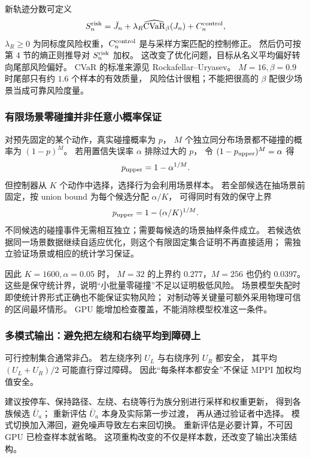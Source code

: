新轨迹分数可定义
\begin{equation}
S_n^{\rm risk}=\bar J_n+\lambda_R\widehat{\operatorname{CVaR}}_\beta(J_n)+C_n^{\rm control},
\label{eq:riskcost}
\end{equation}
$\lambda_R\ge0$ 为同标度风险权重，$C_n^{\rm control}$ 是与采样方案匹配的控制修正。
然后仍可按第 4 节的熵正则推导对 $S_n^{\rm risk}$ 加权。
这改变了优化问题，目标从名义平均偏好转向尾部风险偏好。
CVaR 的标准来源见 Rockafellar--Uryasev\cite{cvarref}。
$M=16,\beta=0.9$ 时尾部只有约 $1.6$ 个样本的有效质量，
风险估计很粗；不能把很高的 $\beta$ 配很少场景当成可靠风险度量。

\subsubsection{有限场景零碰撞并非任意小概率保证}
对预先固定的某个动作，真实碰撞概率为 $p$，
$M$ 个独立同分布场景都不碰撞的概率为 $(1-p)^M$。
若用置信失误率 $\alpha$ 排除过大的 $p$，
令 $(1-p_{\rm upper})^M=\alpha$ 得
\[
p_{\rm upper}=1-\alpha^{1/M}.
\]
但控制器从 $K$ 个动作中选择，选择行为会利用场景样本。
若全部候选在抽场景前固定，按 union bound 为每个候选分配 $\alpha/K$，
可得同时有效的保守上界
\begin{equation}
p_{\rm upper}=1-(\alpha/K)^{1/M}.
\label{eq:scenario}
\end{equation}
不同候选的碰撞事件无需相互独立；需要每候选的场景抽样条件成立。
若候选依据同一场景数据继续自适应优化，则这个有限固定集合证明不再直接适用；
需独立验证场景或相应的统计学习保证。

因此 $K=1600,\alpha=0.05$ 时，
$M=32$ 的上界约 $0.277$，$M=256$ 也仍约 $0.0397$。
这些是保守统计界，说明“小批量零碰撞”不足以证明极低风险。
场景模型失配时即使统计界形式正确也不能保证实物风险；
对制动等关键量可额外采用物理可信的区间最坏情形。
GPU 能增加检查覆盖，不能消除模型校准这一条件。

\subsubsection{多模式输出：避免把左绕和右绕平均到障碍上}
可行控制集合通常非凸。
若左绕序列 $U_L$ 与右绕序列 $U_R$ 都安全，
其平均 $(U_L+U_R)/2$ 可能直行穿过障碍。
因此“每条样本都安全”不保证 MPPI 加权均值安全。

建议按停车、保持路径、左绕、右绕等行为族分别进行采样和权重更新，
得到各族候选 $\bar U_a$；
重新评估 $\bar U_a$ 本身及实际第一步过渡，
再从通过验证者中选择。
模式切换加入滞回，避免噪声导致左右来回切换。
重新评估是必要计算，不可因 GPU 已检查样本就省略。
这项重构改变的不仅是样本数，还改变了输出决策结构。

